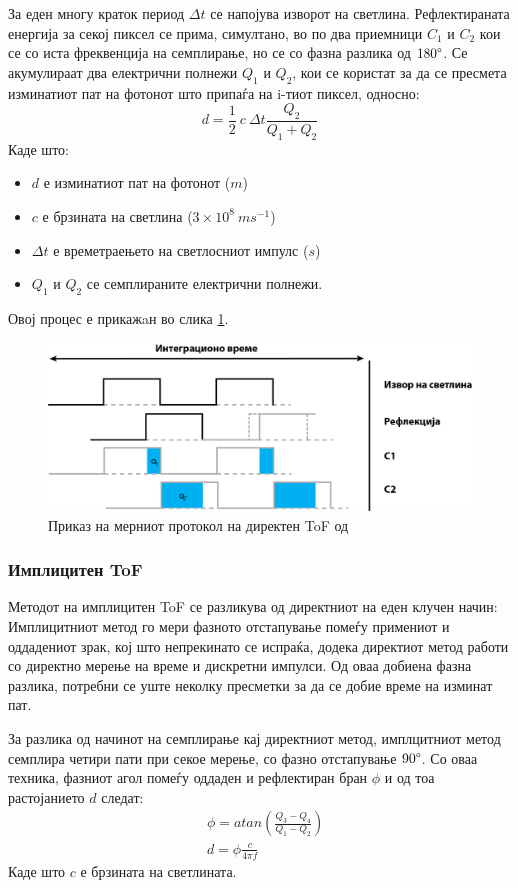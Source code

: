 \documentclass[11pt]{article}
\begin{document}
		За еден многу краток период $ \Delta t $ се напојува изворот на светлина. Рефлектираната енергија за секој пиксел се прима, симултано, во по два приемници $C_1$ и $C_2$ кои се со иста фреквенција на семплирање, но се со фазна разлика од $180 \degree$. Се акумулираат два електрични полнежи $Q_1$ и  $Q_2$, кои се користат за да се пресмета изминатиот пат на фотонот што припаѓа на i-тиот пиксел, односно:
		\begin{equation}
      d = \frac{1}{2} \ c\  \Delta t \frac{Q_2}{Q_1 + Q_2}
    \end{equation}
    Каде што:
		\begin{itemize}
			\item $d$ е изминатиот пат на фотонот ($m$)
			\item $c$ е брзината на светлина ($ 3 \times 10^8\ ms^{-1} $)
			\item $\Delta t$ е времетраењето на светлосниот импулс ($s$)
			\item $Q_1$ и $Q_2$ се семплираните електрични полнежи.
			\end{itemize}
    Овој процес е прикажaн во слика \ref{fig:impulseToF}.
		\begin{figure}[H]
			\includegraphics[width=0.75\linewidth]{./images/impulseToF.png}
			\centering
			\caption{Приказ на мерниот протокол на директен ToF од \cite{tofwhitepaper}}
			\label{fig:impulseToF}
			\end{figure}

	  \subsubsection{Имплицитен ToF}
		Методот на имплицитен ToF се разликува од директниот на еден клучен начин: Имплицитниот метод го мери фазното отстапување помеѓу примениот и оддадениот зрак, кој што непрекинато се испраќа, додека директиот метод работи со директно мерење на време и дискретни импулси. Од оваа добиена фазна разлика, потребни се уште неколку пресметки за да се добие време на изминат пат.

		За разлика од начинот на семплирање кај директниот метод, имплцитниот метод семплира четири пати при секое мерење, со фазно отстапување $90\degree$. Со оваа техника, фазниот агол помеѓу оддаден и рефлектиран бран $\phi$ и од тоа растојанието $d$ следат:
    \begin{align}
       & \phi = atan(\frac{Q_3 - Q_4}{Q_1 - Q_2})\\
       & d = \phi \frac{c}{4\pi f}
    \end{align}
    Каде што $c$ е брзината на светлината.
\end{document}
